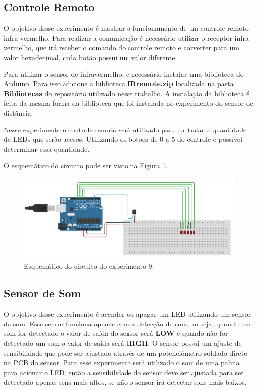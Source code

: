 \documentclass[12pt]{article}
\begin{document}
\subsection{Controle Remoto}
O objetivo desse experimento é mostrar o funcionamento de um controle remoto infra-vermelho. Para realizar a comunicação é necessário utilizar o receptor infra-vermelho, que irá receber o comando do controle remoto e converter para um valor hexadecimal, cada botão possui um valor diferente.

Para utilizar o sensor de infravermelho, é necessário instalar uma biblioteca do Arduino. Para isso adicione a biblioteca \textbf{IRremote.zip} localizada na pasta \textbf{Bibliotecas} do repositório utilizado nesse trabalho. A instalação da biblioteca é feita da mesma forma da biblioteca que foi instalada no experimento do sensor de distância.

Nesse experimento o controle remoto será utilizado para controlar a quantidade de LEDs que serão acesos. Utilizando os botoes de 0 a 5 do controle é possível determinar essa quantidade.

O esquemático do circuito pode ser visto na Figura \ref{figExp9esq}.

\begin{figure}[H]
	\centering
	\includegraphics[scale=0.6]{Imagens/Experimentos/9-ControleRemoto/esq.png}
	\caption{Esquemático do circuito do experimento 9.}
	\label{figExp9esq}
\end{figure}

\subsection{Sensor de Som}
O objetivo desse experimento é acender ou apagar um LED utilizando um sensor de som. Esse sensor funciona apenas com a detecção de som, ou seja, quando um som for detectado o valor de saída do sensor será \textbf{LOW} e quando não for detectado um som o valor de saída será \textbf{HIGH}. O sensor possui um ajuste de sensibilidade que pode ser ajustado através de um potenciômetro soldado direto na PCB do sensor. Para esse experimento será utilizado o som de uma palma para acionar o LED, então a sensibilidade do sensor deve ser ajustada para ser detectado apenas sons mais altos, se não o sensor irá detectar sons mais baixos.
\end{document}
